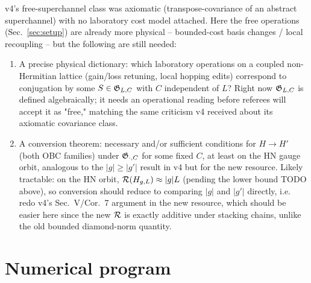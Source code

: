 \begin{todo}
v4's free-superchannel class was axiomatic (transpose-covariance of
an abstract superchannel) with no laboratory cost model attached.
Here the free operations (Sec.~\ref{sec:setup}) are already more
physical -- bounded-cost basis changes / local recoupling -- but
the following are still needed:
\begin{enumerate}
\item A precise physical dictionary: which laboratory operations on
  a coupled non-Hermitian lattice (gain/loss retuning, local
  hopping edits) correspond to conjugation by some $S\in\mathfrak G_{L,C}$
  with $C$ independent of $L$? Right now $\mathfrak G_{L,C}$ is defined
  algebraically; it needs an operational reading before referees
  will accept it as "free," matching the same criticism v4 received
  about its axiomatic covariance class.
\item A conversion theorem: necessary and/or sufficient conditions
  for $H\to H'$ (both OBC families) under $\mathfrak G_{\cdot,C}$ for
  some fixed $C$, at least on the HN gauge orbit, analogous to the
  $|g|\ge|g'|$ result in v4 but for the new resource. Likely
  tractable: on the HN orbit, $\mathcal R(H_{g,L})\approx|g|L$
  (pending the lower bound TODO above), so conversion should reduce
  to comparing $|g|$ and $|g'|$ directly, i.e. redo v4's
  Sec.~V/Cor.~7 argument in the new resource, which should be
  easier here since the new $\mathcal R$ is exactly additive under
  stacking chains, unlike the old bounded diamond-norm quantity.
\end{enumerate}
\end{todo}

\section{Numerical program}
\label{sec:numerics}

